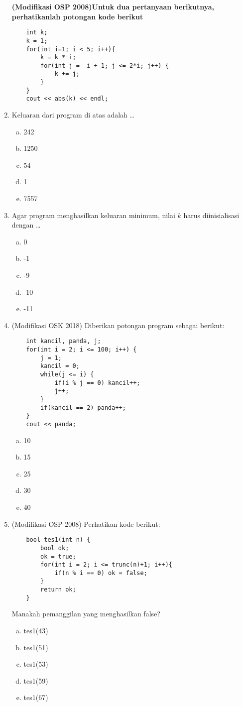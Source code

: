 \documentclass[11pt]{scrartcl}
\begin{document}
\begin{enumerate}
	\textbf{(Modifikasi OSP 2008)Untuk dua pertanyaan berikutnya, perhatikanlah potongan kode berikut}
	\begin{lstlisting}
	int k;
	k = 1;
	for(int i=1; i < 5; i++){
		k = k * i;
		for(int j =  i + 1; j <= 2*i; j++) {
			k += j;
		}
	}
	cout << abs(k) << endl;
	\end{lstlisting}
	\item Keluaran dari program di atas adalah \dots
	\begin{enumerate}[a)]
		\item 242
		\item 1250
		\item 54
		\item 1
		\item 7557
	\end{enumerate}
	
	\item Agar program menghasilkan keluaran minimum, 
	nilai $k$ harus diinisialisasi dengan \dots
		\begin{enumerate}[a)]
			\item 0
			\item -1
			\item -9
			\item -10
			\item -11
		\end{enumerate}
		
	\item (Modifikasi OSK 2018) Diberikan potongan program sebagai berikut:
	\begin{lstlisting}
	int kancil, panda, j;
	for(int i = 2; i <= 100; i++) {
		j = 1;
		kancil = 0;
		while(j <= i) {
			if(i % j == 0) kancil++;
			j++;
		}
		if(kancil == 2) panda++;
	}
	cout << panda;
	\end{lstlisting}
\begin{enumerate}[a)]
			\item 10
			\item 15
			\item 25
			\item 30
			\item 40
	\end{enumerate}
	
\item (Modifikasi OSP 2008) Perhatikan kode berikut:
	\begin{lstlisting}
	bool tes1(int n) {
		bool ok;
		ok = true;
		for(int i = 2; i <= trunc(n)+1; i++){
			if(n % i == 0) ok = false;
		}
		return ok;
	}
	\end{lstlisting}
	Manakah pemanggilan yang menghasilkan false?
	\begin{enumerate}[a)]
	\item tes1(43)
	\item tes1(51)
	\item tes1(53)
	\item tes1(59)
	\item tes1(67)
	\end{enumerate}
	

\end{enumerate}
\end{document}
